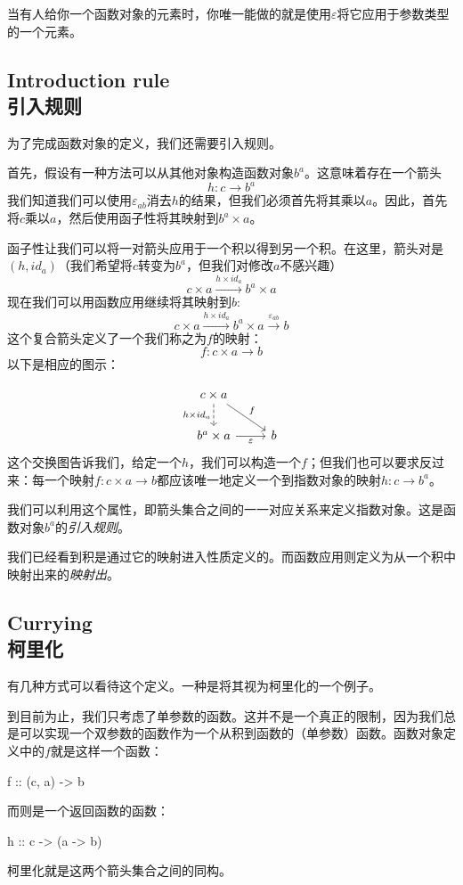 \documentclass[DaoFP]{subfiles}
\begin{document}
 当有人给你一个函数对象的元素时，你唯一能做的就是使用$\varepsilon$将它应用于参数类型的一个元素。

 \subsection{Introduction rule\\引入规则}
 为了完成函数对象的定义，我们还需要引入规则。

 首先，假设有一种方法可以从其他对象构造函数对象$b^a$。这意味着存在一个箭头
 \[h \colon c \to b^a\]
 我们知道我们可以使用$\varepsilon_{a b}$消去$h$的结果，但我们必须首先将其乘以$a$。因此，首先将$c$乘以$a$，然后使用函子性将其映射到$b^a \times a$。

 函子性让我们可以将一对箭头应用于一个积以得到另一个积。在这里，箭头对是$(h, id_a)$（我们希望将$c$转变为$b^a$，但我们对修改$a$不感兴趣）
 \[ c \times a \xrightarrow{h \times id_a} b^a \times a \]
 现在我们可以用函数应用继续将其映射到$b$:
 \[ c \times a \xrightarrow{h \times id_a} b^a \times a \xrightarrow{\varepsilon_{a b}} b\]
 这个复合箭头定义了一个我们称之为$f$的映射：
 \[f \colon c \times a \to b\]
 以下是相应的图示：

 \[
  \begin{tikzcd}
   c \times a
   \arrow[d, dashed, "h \times id_a"']
   \arrow[rd, "f"]
   \\
   b^a \times a
   \arrow[r, "\varepsilon"']
   & b
  \end{tikzcd}
 \]
 这个交换图告诉我们，给定一个$h$，我们可以构造一个$f$；但我们也可以要求反过来：每一个映射$f \colon c \times a \to b$都应该唯一地定义一个到指数对象的映射$h \colon c \to b^a$。

 我们可以利用这个属性，即箭头集合之间的一一对应关系来定义指数对象。这是函数对象$b^a$的\emph{引入规则}。

 我们已经看到积是通过它的映射进入性质定义的。而函数应用则定义为从一个积中映射出来的\emph{映射出}。

 \subsection{Currying\\柯里化}

 有几种方式可以看待这个定义。一种是将其视为柯里化的一个例子。

 到目前为止，我们只考虑了单参数的函数。这并不是一个真正的限制，因为我们总是可以实现一个双参数的函数作为一个从积到函数的（单参数）函数。函数对象定义中的$f$就是这样一个函数：
 \begin{haskell}
  f :: (c, a) -> b
 \end{haskell}
 而则是一个返回函数的函数：
 \begin{haskell}
  h :: c -> (a -> b)
 \end{haskell}
 柯里化就是这两个箭头集合之间的同构。
\end{document}
